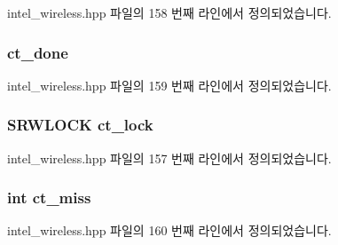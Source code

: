 intel\+\_\+wireless.\+hpp 파일의 158 번째 라인에서 정의되었습니다.

\subsubsection[{\texorpdfstring{ct\+\_\+done}{ct_done}}]{ ct\+\_\+done\hspace{0.3cm}{\ttfamily [private]}}\hypertarget{class_intel_wireless_adapter_ab7386280881b5fe0d79562d65f42152b}{}\label{class_intel_wireless_adapter_ab7386280881b5fe0d79562d65f42152b}


intel\+\_\+wireless.\+hpp 파일의 159 번째 라인에서 정의되었습니다.

\subsubsection[{\texorpdfstring{ct\+\_\+lock}{ct_lock}}]{\setlength{\rightskip}{0pt plus 5cm}S\+R\+W\+L\+O\+CK ct\+\_\+lock\hspace{0.3cm}{\ttfamily [private]}}\hypertarget{class_intel_wireless_adapter_a5fa67f021cca2b2c598bbc494b119fe9}{}\label{class_intel_wireless_adapter_a5fa67f021cca2b2c598bbc494b119fe9}


intel\+\_\+wireless.\+hpp 파일의 157 번째 라인에서 정의되었습니다.

\subsubsection[{\texorpdfstring{ct\+\_\+miss}{ct_miss}}]{\setlength{\rightskip}{0pt plus 5cm}int ct\+\_\+miss\hspace{0.3cm}{\ttfamily [private]}}\hypertarget{class_intel_wireless_adapter_a8926532f4aef8773a0afb7646863188a}{}\label{class_intel_wireless_adapter_a8926532f4aef8773a0afb7646863188a}


intel\+\_\+wireless.\+hpp 파일의 160 번째 라인에서 정의되었습니다.

